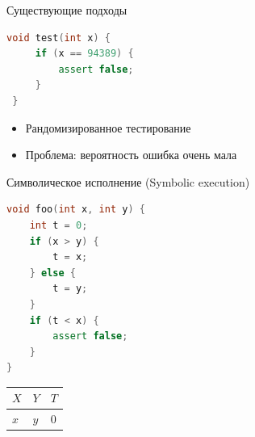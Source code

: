 \documentclass{beamer}
\begin{document}
\begin{frame}[fragile]{Существующие подходы}
\begin{minipage}{0.49\textwidth}
\begin{lstlisting}[language=C++]
 void test(int x) {
     if (x == 94389) {
         assert false;
     }
 }
\end{lstlisting}
\end{minipage}
\begin{minipage}{0.49\textwidth}
\begin{itemize}
\item Рандомизированное тестирование
\item Проблема: вероятность ошибка очень мала
\end{itemize}
\end{minipage}
\end{frame}

\begin{frame}[fragile]{Символическое исполнение (Symbolic execution)}
\begin{minipage}{0.49\textwidth}
\begin{lstlisting}[language=C++]
void foo(int x, int y) {
    int t = 0;
    if (x > y) {
        t = x;
    } else {
        t = y;
    }
    if (t < x) {
        assert false;
    }
}
\end{lstlisting}
\end{minipage}
\hfill
\begin{minipage}{0.49\textwidth}
\begin{center}
\begin{tabular}{ | l | l | l | }
\hline
$X$ & $Y$ & $T$ \\
\hline
$x$ & $y$ & 0 \\
\hline
\end{tabular}
\end{center}
\end{minipage}
\end{frame}
\end{document}
